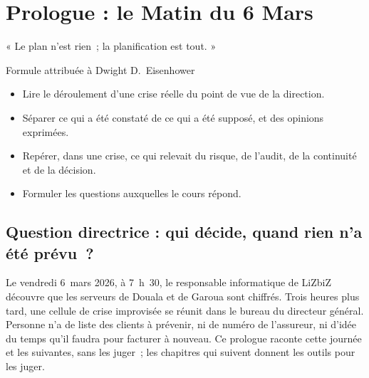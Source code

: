 
\chapter{Prologue : le Matin du 6 Mars}
\label{chap:prologue}

\epigraph{%
    « Le plan n'est rien~; la planification est tout. »%
}{Formule attribuée à Dwight D.~Eisenhower}


\begin{boxobjectifs}
\begin{itemize}
    \item Lire le déroulement d'une crise réelle du point de vue de la
          direction.
    \item Séparer ce qui a été constaté de ce qui a été supposé, et des
          opinions exprimées.
    \item Repérer, dans une crise, ce qui relevait du risque, de l'audit, de
          la continuité et de la décision.
    \item Formuler les questions auxquelles le cours répond.
\end{itemize}
\end{boxobjectifs}

\bigskip

\section*{Question directrice : qui décide, quand rien n'a été prévu~?}

Le vendredi 6~mars 2026, à 7~h~30, le responsable informatique de LiZbiZ
découvre que les serveurs de Douala et de Garoua sont chiffrés. Trois
heures plus tard, une cellule de crise improvisée se réunit dans le bureau
du directeur général. Personne n'a de liste des clients à prévenir, ni de
numéro de l'assureur, ni d'idée du temps qu'il faudra pour facturer à
nouveau. Ce prologue raconte cette journée et les suivantes, sans les
juger~; les chapitres qui suivent donnent les outils pour les juger.

